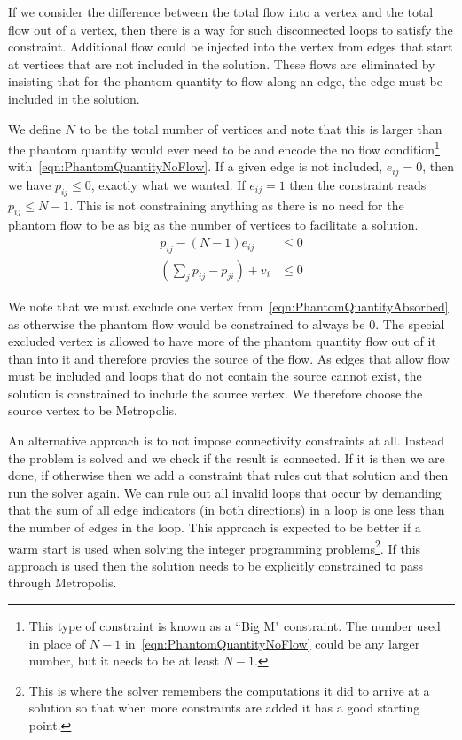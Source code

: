 If we consider the difference between the total flow into a vertex and the total flow out of a vertex, then there is a way for such disconnected loops to satisfy the constraint. Additional flow could be injected into the vertex from edges that start at vertices that are not included in the solution. These flows are eliminated by insisting that for the phantom quantity to flow along an edge, the edge must be included in the solution.

We define $N$ to be the total number of vertices and note that this is larger than the phantom quantity would ever need to be and encode the no flow condition\footnote{This type of constraint is known as a ``Big M" constraint. The number used in place of $N - 1$ in~\eqref{eqn:PhantomQuantityNoFlow} could be any larger number, but it needs to be at least $N - 1$.} with~\eqref{eqn:PhantomQuantityNoFlow}. If a given edge is not included, $e_{ij} = 0$, then we have $p_{ij} \le 0$, exactly what we wanted. If $e_{ij} = 1$ then the constraint reads $p_{ij} \le N - 1$. This is not constraining anything as there is no need for the phantom flow to be as big as the number of vertices to facilitate a solution.
\begin{subequations}
	\begin{align}
		p_{ij} - (N - 1)e_{ij} &\le 0
		\label{eqn:PhantomQuantityNoFlow} \\
		\left( \sum_j p_{ij} - p_{ji} \right) + v_i &\le 0
		\label{eqn:PhantomQuantityAbsorbed}
	\end{align}
\end{subequations}

We note that we must exclude one vertex from~\eqref{eqn:PhantomQuantityAbsorbed} as otherwise the phantom flow would be constrained to always be $0$. The special excluded vertex is allowed to have more of the phantom quantity flow out of it than into it and therefore provies the source of the flow. As edges that allow flow must be included and loops that do not contain the source cannot exist, the solution is constrained to include the source vertex. We therefore choose the source vertex to be Metropolis.

An alternative approach is to not impose connectivity constraints at all. Instead the problem is solved and we check if the result is connected. If it is then we are done, if otherwise then we add a constraint that rules out that solution and then run the solver again. We can rule out all invalid loops that occur by demanding that the sum of all edge indicators (in both directions) in a loop is one less than the number of edges in the loop. This approach is expected to be better if a warm start is used when solving the integer programming problems\footnote{This is where the solver remembers the computations it did to arrive at a solution so that when more constraints are added it has a good starting point.}. If this approach is used then the solution needs to be explicitly constrained to pass through Metropolis.